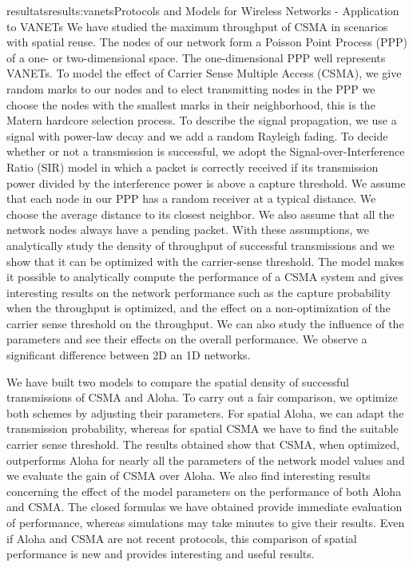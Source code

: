 \documentclass{ra2016}
\begin{document}
\begin{module}{resultats}{results:vanets}{Protocols and Models for Wireless Networks - Application to VANETs}
We have studied  the maximum throughput of CSMA in scenarios with spatial reuse.
The nodes of our network form a Poisson Point Process (PPP) of a one- or two-dimensional space.
The one-dimensional PPP well represents VANETs.
To model the effect of Carrier Sense Multiple Access (CSMA), we give random marks to our nodes and to elect transmitting nodes in the PPP we choose the nodes with the smallest marks in their neighborhood, this is the Matern hardcore selection process.
To describe the signal propagation, we use a signal with power-law decay and we add a random Rayleigh fading.
To decide whether or not a transmission is successful, we adopt the Signal-over-Interference Ratio (SIR) model in which a packet is correctly received if its transmission power divided by the interference power is above a capture threshold.
We assume that each node in our PPP has a random receiver at a typical distance.
We choose the average distance to its closest neighbor.
We also assume that all the network nodes always have a pending packet.
With these assumptions, we analytically study the density of throughput of successful transmissions and we show that it can be optimized with the carrier-sense threshold. 
 The model makes it possible to analytically compute the 
 performance of a CSMA system and gives 
 interesting results on the network performance such as the capture probability 
 when the throughput is optimized, and the effect on a non-optimization of the 
 carrier sense threshold on the throughput. We can also study the influence 
of the parameters and  see their effects on the overall performance. 
We observe a significant difference between 2D an 1D networks.

We have built two models  to compare the spatial density of successful 
transmissions of CSMA and Aloha. 
To carry out a  fair comparison, we optimize both schemes by adjusting their parameters. 
For spatial Aloha, we can adapt the 
transmission probability, whereas for spatial CSMA we have to find the suitable carrier sense threshold. The results obtained show that CSMA, when optimized, outperforms Aloha 
for nearly all the parameters of the network model values 
and we evaluate the gain of CSMA over Aloha. 
We also find interesting results concerning the effect of the model parameters on the performance 
of both Aloha and CSMA. 
The closed formulas we have obtained provide immediate evaluation of performance, whereas 
simulations may take minutes to give their results. Even if Aloha and CSMA are not recent protocols, 
this comparison of spatial performance is new and provides interesting and useful results. 


\end{module}
\end{document}
